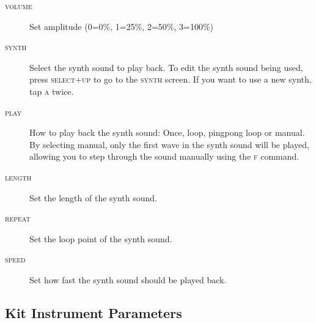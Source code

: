 \begin{description}
	\item[\textsc{volume}] Set amplitude (0=0\%, 1=25\%, 2=50\%, 3=100\%)
	\item[\textsc{synth}] Select the synth sound to play back. To edit the synth sound being used, press \textsc{select+up} to go to the \textsc{synth} screen. If you want to use a new synth, tap \textsc{a} twice.
	\item[\textsc{play}] How to play back the synth sound: Once, loop, pingpong loop or manual. By selecting manual, only the first wave in the synth sound will be played, allowing you to step through the sound manually using the \textsc{f} command.
	\item[\textsc{length}] Set the length of the synth sound.
	\item[\textsc{repeat}] Set the loop point of the synth sound.
	\item[\textsc{speed}] Set how fast the synth sound should be played back.
\end{description}

\subsection{Kit Instrument Parameters}

\begin{figure}[hbtp]
	\begin{center}
	\end{center}
\end{figure}

